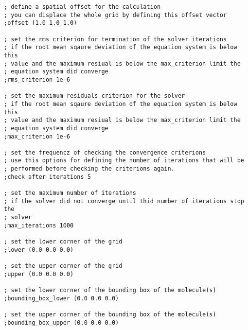 \documentclass[12pt,twoside,a4paper]{article}
\begin{document}
\begin{verbatim}
; define a spatial offset for the calculation
; you can displace the whole grid by defining this offset vector
;offset (1.0 1.0 1.0)

; set the rms criterion for termination of the solver iterations
; if the root mean sqaure deviation of the equation system is below this
; value and the maximum resiual is below the max_criterion limit the
; equation system did converge
;rms_criterion 1e-6

; set the maximum residuals criterion for the solver
; if the root mean sqaure deviation of the equation system is below this
; value and the maximum resiual is below the max_criterion limit the
; equation system did converge
;max_criterion 1e-6

; set the frequencz of checking the convergence criterions
; use this options for defining the number of iterations that will be
; performed before checking the criterions again.
;check_after_iterations 5

; set the maximum number of iterations
; if the solver did not converge until thid number of iterations stop the
; solver
;max_iterations 1000

; set the lower corner of the grid
;lower (0.0 0.0 0.0)

; set the upper corner of the grid
;upper (0.0 0.0 0.0)

; set the lower corner of the bounding box of the molecule(s)
;bounding_box_lower (0.0 0.0 0.0)

; set the upper corner of the bounding box of the molecule(s)
;bounding_box_upper (0.0 0.0 0.0)
\end{verbatim}
\normalsize
\end{document}
